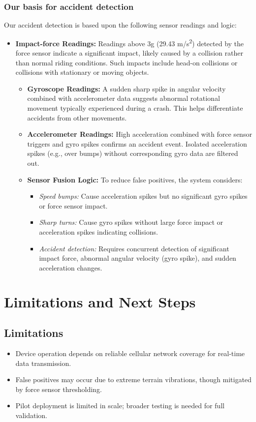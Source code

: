 \documentclass[12pt]{article}
\begin{document}
\subsubsection{Our basis for accident detection}
Our accident detection is based upon the following sensor readings and logic:

\begin{itemize}
  \item \textbf{Impact-force Readings:}  
  Readings above 3g (29.43 m/s\textsuperscript{2}) detected by the force sensor indicate a significant impact, likely caused by a collision rather than normal riding conditions. Such impacts include head-on collisions or collisions with stationary or moving objects.
  \begin{itemize}
    \item \textbf{Gyroscope Readings:}  
    A sudden sharp spike in angular velocity combined with accelerometer data suggests abnormal rotational movement typically experienced during a crash. This helps differentiate accidents from other movements.
    \item \textbf{Accelerometer Readings:}  
    High acceleration combined with force sensor triggers and gyro spikes confirms an accident event. Isolated acceleration spikes (e.g., over bumps) without corresponding gyro data are filtered out.
    \item \textbf{Sensor Fusion Logic:}  
    To reduce false positives, the system considers:  
    \begin{itemize}
      \item \textit{Speed bumps:} Cause acceleration spikes but no significant gyro spikes or force sensor impact.  
      \item \textit{Sharp turns:} Cause gyro spikes without large force impact or acceleration spikes indicating collisions.  
      \item \textit{Accident detection:} Requires concurrent detection of significant impact force, abnormal angular velocity (gyro spike), and sudden acceleration changes.  
    \end{itemize}
  \end{itemize}
\end{itemize}

\section{Limitations and Next Steps}

\subsection{Limitations}
\begin{itemize}
  \item Device operation depends on reliable cellular network coverage for real-time data transmission.
  \item False positives may occur due to extreme terrain vibrations, though mitigated by force sensor thresholding.
  \item Pilot deployment is limited in scale; broader testing is needed for full validation.
\end{itemize}
\end{document}
